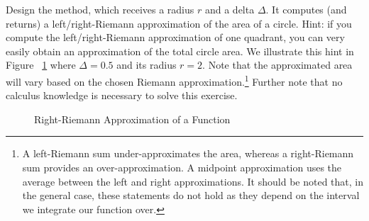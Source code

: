 Design the  method, which receives a radius $r$ and a delta $\Delta$. It computes (and returns) a left/right-Riemann approximation of the area of a circle. Hint: if you compute the left/right-Riemann approximation of one quadrant, you can very easily obtain an approximation of the total circle area. We illustrate this hint in Figure ~\ref{fig:circlearea} where $\Delta=0.5$ and its radius $r=2$. Note that the approximated area will vary based on the chosen Riemann approximation.\footnote{A left-Riemann sum under-approximates the area, whereas a right-Riemann sum provides an over-approximation. A midpoint approximation uses the average between the left and right approximations. It should be noted that, in the general case, these statements do not hold as they depend on the interval we integrate our function over.} Further note that no calculus knowledge is necessary to solve this exercise.

\begin{figure}[H]
\begin{center}

\end{center}
\caption{Right-Riemann Approximation of a Function}
\label{fig:circlearea}
\end{figure}